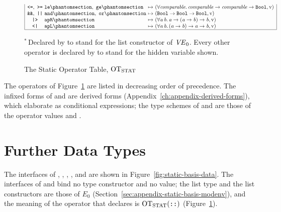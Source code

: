\begin{figure}[htbp]
\[\begin{array}{|c@{\ }l@{\ }c@{\ }l|}
\kw{<=},\ \kw{>=} & \kw{le}\citelabel{b:Basics.le},\ \kw{ge}\citelabel{b:Basics.ge} & \mapsto & (\forall\mv{comparable}.\,\mv{comparable} \rightarrow \mv{comparable} \rightarrow \tBool, \isv)\\
\kw{\&\&},\ \kw{||} & \kw{and}\citelabel{b:Basics.and},\ \kw{or}\citelabel{b:Basics.or} & \mapsto & (\tBool \rightarrow \tBool \rightarrow \tBool, \isv)\\
\kw{|>} & \kw{apR}\citelabel{b:Basics.apR} & \mapsto & (\forall\mv{a}\,\mv{b}.\,\mv{a} \rightarrow (\mv{a} \rightarrow \mv{b}) \rightarrow \mv{b}, \isv)\\
\kw{<|} & \kw{apL}\citelabel{b:Basics.apL} & \mapsto & (\forall\mv{a}\,\mv{b}.\,(\mv{a} \rightarrow \mv{b}) \rightarrow \mv{a} \rightarrow \mv{b}, \isv)\\
\hline
\end{array}
\]
\par\smallskip
\begin{minipage}{0.8\textwidth}\small
${}^{*}$\,Declared by  to stand for the list constructor \kw{::}
of $\mathit{VE}_0$. Every other operator is declared by  to stand for the
hidden variable shown.
\end{minipage}
\caption{The Static Operator Table, $\mathrm{OT}_{\mathrm{STAT}}$}\label{fig:static-basis-operators}
\end{figure}

The operators of Figure~\ref{fig:static-basis-operators} are listed in
decreasing order of precedence. The infixed forms of \kw{\&\&} and \kw{||} are
derived forms (Appendix~\ref{ch:appendix-derived-forms}), which elaborate as
conditional expressions; the type schemes of  and  are those of
the operator values \kw{(\&\&)} and \kw{(||)}. %

\section{Further Data Types}\label{sec:appendix-static-basis-data}

The interfaces of , , , ,
 and  are shown in Figure~\ref{fig:static-basis-data}. The interfaces of
 and  bind no type constructor and no value; the list type
and the list constructors are those of $E_0$
(Section~\ref{sec:appendix-static-basis-modenv}), and the meaning of the
operator \kw{::} that  declares is $\mathrm{OT}_{\mathrm{STAT}}(\textnormal{\texttt{::}})$
(Figure~\ref{fig:static-basis-operators}).

